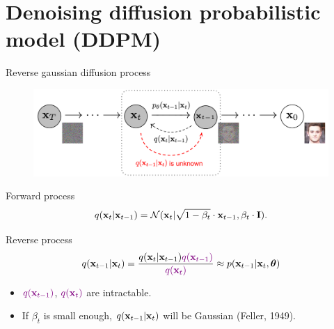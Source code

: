 \section{Denoising diffusion probabilistic model (DDPM)}
\begin{frame}{Reverse gaussian diffusion process}
	\begin{figure}
		\includegraphics[width=0.8\linewidth]{figs/DDPM}
	\end{figure}
	\vspace{-0.5cm}
	\begin{block}{Forward process}
		\vspace{-0.3cm}
		\[
			q(\mathbf{x}_t | \mathbf{x}_{t-1}) = \mathcal{N}(\mathbf{x}_t | \sqrt{1 - \beta_t} \cdot \mathbf{x}_{t-1}, \beta_t \cdot \mathbf{I}).
		\]
		\vspace{-0.5cm}
	\end{block}
	\begin{block}{Reverse process}
		\vspace{-0.3cm}
		\[
			q(\mathbf{x}_{t-1}|\mathbf{x}_{t}) = \frac{q(\mathbf{x}_{t}|\mathbf{x}_{t-1}) {\color{violet}q(\mathbf{x}_{t-1})}}{{\color{violet}q(\mathbf{x}_{t})}} \approx p(\mathbf{x}_{t - 1} | \mathbf{x}_t, \boldsymbol{\theta})
		\]
		\vspace{-0.3cm}
		\begin{itemize}
			\item ${\color{violet}q(\mathbf{x}_{t-1})}$, ${\color{violet}q(\mathbf{x}_{t})}$ are intractable.
			\item If $\beta_t$ is small enough, $q(\mathbf{x}_{t-1}|\mathbf{x}_{t})$ will be Gaussian (Feller, 1949).
		\end{itemize}
	\end{block}
	\end{frame}
